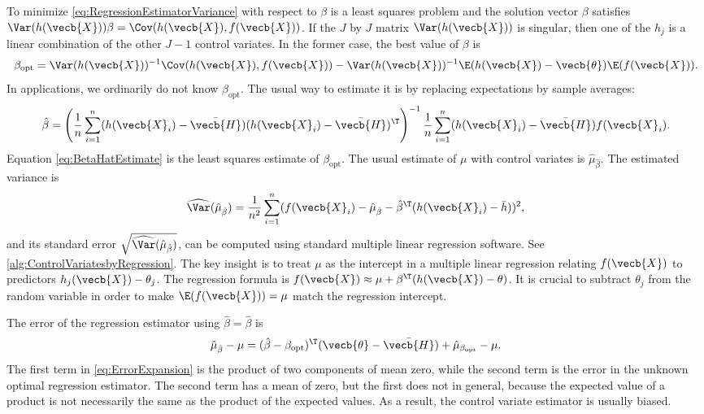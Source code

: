 To minimize \cref{eq:RegressionEstimatorVariance} with respect to \(\beta\) is a least squares problem and the solution vector \(\beta\) satisfies \(\Var(h(\vecb{X}))\beta = \Cov(h(\vecb{X}), f(\vecb{X}))\). If the \(J\) by \(J\) matrix \(\Var(h(\vecb{X}))\) is singular, then one of the \(h_j\) is a linear combination of the other \(J-1\) control variates. In the former case, the best value of \(\beta\) is
\begin{equation}
	\beta_{\text{opt}} = \Var(h(\vecb{X}))^{-1} \Cov(h(\vecb{X}), f(\vecb{X})) - \Var(h(\vecb{X}))^{-1} \E(h(\vecb{X}) - \vecb{\theta}) \E(f(\vecb{X})).
	\label{eq:BetaOptMatrix}
\end{equation}
In applications, we ordinarily do not know \(\beta_{\text{opt}}\). The usual way to estimate it is by replacing expectations by sample averages:
\begin{equation}
	\hat{\beta} = \left(\frac{1}{n} \sum_{i=1}^n (h(\vecb{X}_i) - \bar{\vecb{H}}) (h(\vecb{X}_i) - \bar{\vecb{H}})^{\T}\right)^{-1} \frac{1}{n} \sum_{i=1}^n (h(\vecb{X}_i) - \bar{\vecb{H}}) f(\vecb{X}_i).
	\label{eq:BetaHatEstimate}
\end{equation}
Equation \cref{eq:BetaHatEstimate} is the least squares estimate of \(\beta_{\text{opt}}\). The usual estimate of \(\mu\) with control variates is \(\hat{\mu}_{\hat{\beta}}\). The estimated variance is
\begin{equation}
	\widehat{\Var}(\hat{\mu}_{\hat{\beta}}) = \frac{1}{n^2} \sum_{i=1}^n (f(\vecb{X}_i) - \hat{\mu}_{\hat{\beta}} - \hat{\beta}^{\T} (h(\vecb{X}_i) - \bar{h}))^2,
	\label{eq:EstimatedVarianceBeta}
\end{equation}
and its standard error \(\sqrt{\widehat{\Var}(\hat{\mu}_{\hat{\beta}})}\), can be computed using standard multiple linear regression software. See \cref{alg:ControlVariatesbyRegression}. The key insight is to treat \(\mu\) as the intercept in a multiple linear regression relating \(f(\vecb{X})\) to predictors \(h_j(\vecb{X}) - \theta_j\). The regression formula is \(f(\vecb{X}) \approx \mu + \beta^{\T} (h(\vecb{X}) - \theta)\). It is crucial to subtract \(\theta_j\) from the random variable in order to make \(\E(f(\vecb{X})) = \mu\) match the regression intercept.

The error of the regression estimator using \(\hat{\beta} = \hat{\beta}\) is
\begin{equation}
	\hat{\mu}_{\hat{\beta}} - \mu = (\hat{\beta} - \beta_{\text{opt}})^{\T}(\vecb{\theta} - \bar{\vecb{H}}) + \hat{\mu}_{\beta_{\text{opt}}} - \mu.
	\label{eq:ErrorExpansion}
\end{equation}
The first term in \cref{eq:ErrorExpansion} is the product of two components of mean zero, while the second term is the error in the unknown optimal regression estimator. The second term has a mean of zero, but the first does not in general, because the expected value of a product is not necessarily the same as the product of the expected values. As a result, the control variate estimator is usually biased.

